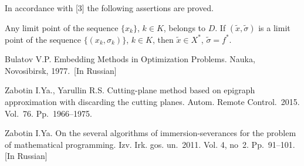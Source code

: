 \documentclass[12pt]{llncs}
\begin{document}
In accordance with [3] the following assertions are proved.
\begin{theorem}
Any limit point of the sequence $\{x_k\}$, $k\in K$, belongs to $D$.
If $(\tilde{x}, \tilde{\sigma})$ is a limit point of the sequence $\{(x_k, \sigma_k)\}$, $k\in K$, then $\tilde{x}\in X^*$, $\tilde{\sigma}=f^*$.
\end{theorem}



\begin{thebibliography}{3} %
Bulatov V.P. Embedding Methods in Optimization Problems. Nauka, Novosibirsk, 1977.~[In Russian]

Zabotin I.Ya., Yarullin R.S. Cutting-plane method based on epigraph approximation with discarding the cutting planes. Autom. Remote Control.~2015. Vol.~76. Pp.~1966--1975.

Zabotin I.Ya. On the several algorithms of immersion-severances for the problem of mathematical programming. Izv. Irk. gos. un.~2011. Vol. 4, no~2. Pp.~91--101. [In Russian]

\end{thebibliography}

\end{document}
